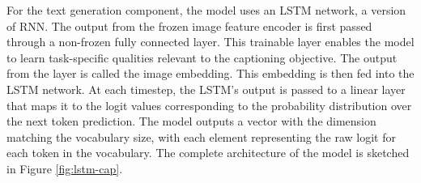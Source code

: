 \documentclass{l4proj}
\begin{document}



For the text generation component, the model uses an LSTM network, a version of RNN. The output from the frozen image feature encoder is first passed through a non-frozen fully connected layer. This trainable layer enables the model to learn task-specific qualities relevant to the captioning objective. The output from the layer is called the image embedding. This embedding is then fed into the LSTM network. At each timestep, the LSTM's output is passed to a linear layer that maps it to the logit values corresponding to the probability distribution over the next token prediction. The model outputs a vector with the dimension matching the vocabulary size, with each element representing the raw logit for each token in the vocabulary. The complete architecture of the model is sketched in Figure \ref{fig:lstm-cap}.
\end{document}
